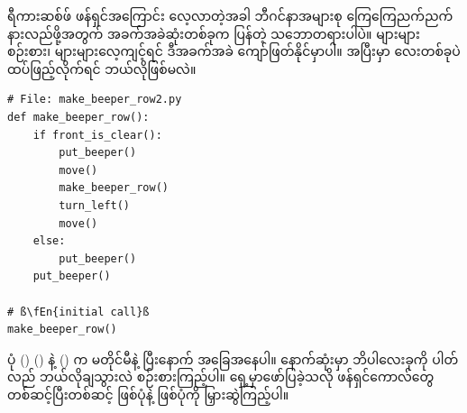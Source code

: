 ရီကားဆစ်ဖ် ဖန်ရှင်အကြောင်း လေ့လာတဲ့အခါ ဘီဂင်နာအများစု ကြေကြေညက်ညက် နားလည်ဖို့အတွက် အခက်အခဲဆုံးတစ်ခုက  ပြန်တဲ့ သဘောတရားပါပဲ။  များများစဉ်းစား၊ များများလေ့ကျင့်ရင် ဒီအခက်အခဲ ကျော်ဖြတ်နိုင်မှာပါ။  အပြီးမှာ  လေးတစ်ခုပဲ ထပ်ဖြည့်လိုက်ရင် ဘယ်လိုဖြစ်မလဲ။
%
\setlength{\fboxsep}{0pt}
\begin{verbatim}
# File: make_beeper_row2.py
def make_beeper_row():
    if front_is_clear():
        put_beeper()
        move()
        make_beeper_row()
        turn_left()
        move()
    else:
        put_beeper()
    put_beeper()

# ß\fEn{initial call}ß
make_beeper_row()
\end{verbatim}
ပုံ (\fRefNo{\ref{fig:mrofb2}}) () နဲ့ () က မတိုင်မီနဲ့ ပြီးနောက် အခြေအနေပါ။ နောက်ဆုံးမှာ ဘိပါလေးခုကို ပါတ်လည် ဘယ်လိုချသွားလဲ စဉ်းစားကြည့်ပါ။ ရှေ့မှာဖော်ပြခဲ့သလို ဖန်ရှင်ကောလ်တွေ တစ်ဆင့်ပြီးတစ်ဆင့် ဖြစ်ပုံနဲ့  ဖြစ်ပုံကို မြှားဆွဲကြည့်ပါ။
